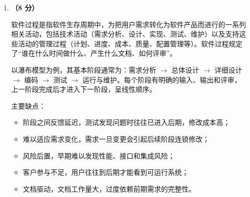 \documentclass[a4paper,11pt]{article}
\begin{document}
\begin{enumerate}[start=29, label=\textbf{\arabic*.}, leftmargin=2.4em, itemsep=0.55em]
传感器（Sensor/Transducer）是一种能感受规定的被测量，并按照一定规律将其转换成可用信号（通常为电信号）的器件或装置，通常由敏感元件和转换元件组成。其要点包括：
\begin{itemize}[leftmargin=1.8em, itemsep=1pt]
  \item 基本组成：敏感元件负责感受被测量，转换元件将非电量转换为电量；
  \item 作用：实现信息获取，是感知层的核心器件，被称为“电五官”；
  \item 分类：按被测量（温度、湿度、压力、光、气体等）、按工作原理、按输出信号（模拟/数字/开关）、按能量传递方式（有源/无源）等；
  \item 主要特性：灵敏度、线性度、重复性、迟滞、漂移、频率响应等静态/动态特性；
  \item 发展趋势：集成化、微型化、智能化、网络化。
\end{itemize}

\item \textbf{（8 分）}

软件过程是指软件生存周期中，为把用户需求转化为软件产品而进行的一系列相关活动，包括技术活动（需求分析、设计、实现、测试、维护）以及支持这些活动的管理过程（计划、进度、成本、质量、配置管理等）。软件过程规定了“谁在什么时间做什么、产生什么文档、如何评审”。

以瀑布模型为例，其基本阶段通常为：需求分析 $\to$ 总体设计 $\to$ 详细设计 $\to$ 编码 $\to$ 测试 $\to$ 运行与维护。每个阶段有明确的输入、输出和评审，上一阶段完成后才进入下一阶段，呈线性顺序。

主要缺点：
\begin{itemize}[leftmargin=1.8em, itemsep=1pt]
  \item 阶段之间反馈延迟，测试发现问题时往往已进入后期，修改成本高；
  \item 难以适应需求变化，需求一旦变更会引起后续阶段连锁修改；
  \item 风险后置，早期难以发现性能、接口和集成风险；
  \item 客户参与不足，用户往往到后期才能看到可运行系统；
  \item 文档驱动，文档工作量大，过度依赖前期需求的完整性。
\end{itemize}


\end{enumerate}
\end{document}
